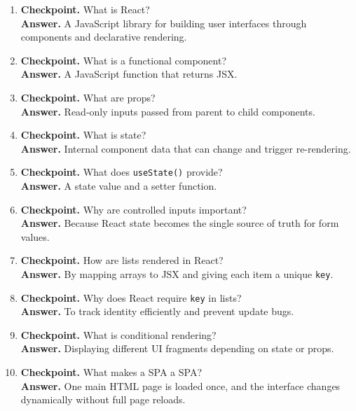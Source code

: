 \documentclass[11pt,a4paper]{article}
\begin{document}
\begin{enumerate}
  \item \textbf{Checkpoint.} What is React?\\
  \textbf{Answer.} A JavaScript library for building user interfaces through components and declarative rendering.

  \item \textbf{Checkpoint.} What is a functional component?\\
  \textbf{Answer.} A JavaScript function that returns JSX.

  \item \textbf{Checkpoint.} What are props?\\
  \textbf{Answer.} Read-only inputs passed from parent to child components.

  \item \textbf{Checkpoint.} What is state?\\
  \textbf{Answer.} Internal component data that can change and trigger re-rendering.

  \item \textbf{Checkpoint.} What does \texttt{useState()} provide?\\
  \textbf{Answer.} A state value and a setter function.

  \item \textbf{Checkpoint.} Why are controlled inputs important?\\
  \textbf{Answer.} Because React state becomes the single source of truth for form values.

  \item \textbf{Checkpoint.} How are lists rendered in React?\\
  \textbf{Answer.} By mapping arrays to JSX and giving each item a unique \texttt{key}.

  \item \textbf{Checkpoint.} Why does React require \texttt{key} in lists?\\
  \textbf{Answer.} To track identity efficiently and prevent update bugs.

  \item \textbf{Checkpoint.} What is conditional rendering?\\
  \textbf{Answer.} Displaying different UI fragments depending on state or props.

  \item \textbf{Checkpoint.} What makes a SPA a SPA?\\
  \textbf{Answer.} One main HTML page is loaded once, and the interface changes dynamically without full page reloads.


\end{enumerate}
\end{document}
